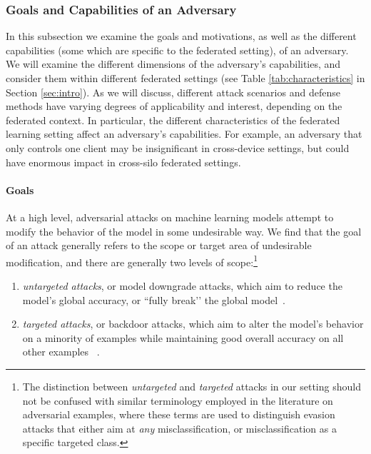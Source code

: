 \subsubsection{Goals and Capabilities of an Adversary}
\label{subsubsec:attack_goals_capabilities}
In this subsection we examine the goals and motivations, as well as the different capabilities (some which are specific to the federated setting), of an adversary. We will examine the different dimensions of the adversary's capabilities, and consider them within different federated settings (see Table \ref{tab:characteristics} in Section \ref{sec:intro}). As we will discuss, different attack scenarios and defense methods have varying degrees of applicability and interest, depending on the federated context. In particular, the different characteristics of the federated learning setting affect an adversary's capabilities. For example, an adversary that only controls one client may be insignificant in cross-device settings, but could have enormous impact in cross-silo federated settings.

\paragraph{Goals}
At a high level, adversarial attacks on machine learning models attempt to modify the behavior of the model in some undesirable way. We find that the goal of an attack generally refers to the scope or target area of undesirable modification, and there are generally two levels of scope:\footnote{The distinction between \emph{untargeted} and \emph{targeted} attacks in our setting should not be confused with similar terminology employed in the literature on adversarial examples, where these terms are used to distinguish evasion attacks that either aim at \emph{any} misclassification, or misclassification as a specific targeted class.}

\begin{enumerate}

\item 
\textit{untargeted attacks}, or model downgrade attacks, which aim to reduce the model's global accuracy, or ``fully break’’ the global model~\cite{Biggio:2012:PAA:3042573.3042761}.

\item
\textit{targeted attacks}, or backdoor attacks, which aim to alter the model’s behavior on a minority of examples while maintaining good overall accuracy on all other examples ~\cite{chen2017targeted, DBLP:conf/ndss/LiuMALZW018, bagdasaryan18backdoor, pmlr-v97-bhagoji19a}.

\end{enumerate}

